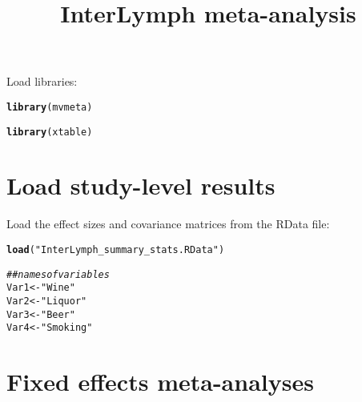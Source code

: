 \documentclass{article}\usepackage[]{graphicx}\usepackage[]{color}
\title{InterLymph meta-analysis}
\makeatletter
\newcommand{\hlstr}[1]{\textcolor[rgb]{0.192,0.494,0.8}{#1}}%
\newcommand{\hlcom}[1]{\textcolor[rgb]{0.678,0.584,0.686}{\textit{#1}}}%
\newcommand{\hlstd}[1]{\textcolor[rgb]{0.345,0.345,0.345}{#1}}%
\newcommand{\hlkwb}[1]{\textcolor[rgb]{0.69,0.353,0.396}{#1}}%
\newcommand{\hlkwd}[1]{\textcolor[rgb]{0.737,0.353,0.396}{\textbf{#1}}}%
\newenvironment{kframe}{%
 \def\at@end@of@kframe{}%
 \ifinner\ifhmode%
  \def\at@end@of@kframe{\end{minipage}}%
  \begin{minipage}{\columnwidth}%
 \fi\fi%
 \def\FrameCommand##1{\hskip\@totalleftmargin \hskip-\fboxsep
 \colorbox{shadecolor}{##1}\hskip-\fboxsep
     \hskip-\linewidth \hskip-\@totalleftmargin \hskip\columnwidth}%
 \MakeFramed {\advance\hsize-\width
   \@totalleftmargin\z@ \linewidth\hsize
   \@setminipage}}%
 {\par\unskip\endMakeFramed%
 \at@end@of@kframe}
\newenvironment{knitrout}{}{} %
\makeatother
\begin{document}
\maketitle



Load libraries:
\begin{knitrout}
\color{fgcolor}\begin{kframe}
\begin{alltt}
\hlkwd{library}\hlstd{(mvmeta)}
\end{alltt}


{\ttfamily\noindent\itshape\color{messagecolor}{\#\# This is mvmeta 0.4.7. For an overview type: help('mvmeta-package').}}\begin{alltt}
\hlkwd{library}\hlstd{(xtable)}
\end{alltt}
\end{kframe}
\end{knitrout}

\section{Load study-level results}

Load the effect sizes and covariance matrices from the RData file:
\begin{knitrout}
\color{fgcolor}\begin{kframe}
\begin{alltt}
\hlkwd{load}\hlstd{(}\hlstr{"InterLymph_summary_stats.RData"}\hlstd{)}

\hlcom{##names of variables}
\hlstd{Var1} \hlkwb{<-} \hlstr{"Wine"}
\hlstd{Var2} \hlkwb{<-} \hlstr{"Liquor"}
\hlstd{Var3} \hlkwb{<-} \hlstr{"Beer"}
\hlstd{Var4} \hlkwb{<-} \hlstr{"Smoking"}
\end{alltt}
\end{kframe}
\end{knitrout}

\section{Fixed effects meta-analyses}
\end{document}
